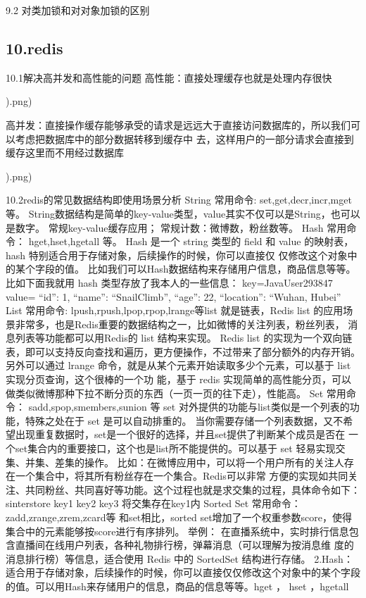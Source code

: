 \documentclass[UTF8]{ctexart}
\begin{document}
9.2 对类加锁和对对象加锁的区别

\subsection{10.redis}

10.1解决高并发和高性能的问题
高性能：直接处理缓存也就是处理内存很快

).png)

高并发：直接操作缓存能够承受的请求是远远大于直接访问数据库的，所以我们可以考虑把数据库中的部分数据转移到缓存中 去，这样用户的一部分请求会直接到缓存这里而不用经过数据库

).png)

10.2redis的常见数据结构即使用场景分析
String
常用命令: set,get,decr,incr,mget 等。 String数据结构是简单的key-value类型，value其实不仅可以是String，也可以是数字。 常规key-value缓存应用； 常规计数：微博数，粉丝数等。
Hash
常用命令： hget,hset,hgetall 等。
Hash 是一个 string 类型的 ﬁeld 和 value 的映射表，hash 特别适合用于存储对象，后续操作的时候，你可以直接仅 仅修改这个对象中的某个字段的值。 比如我们可以Hash数据结构来存储用户信息，商品信息等等。比如下面我就用 hash 类型存放了我本人的一些信息：
key=JavaUser293847 value={ “id”: 1, “name”: “SnailClimb”, “age”: 22, “location”: “Wuhan, Hubei” }
List
常用命令: lpush,rpush,lpop,rpop,lrange等list 就是链表，Redis list 的应用场景非常多，也是Redis重要的数据结构之一，比如微博的关注列表，粉丝列表， 消息列表等功能都可以用Redis的 list 结构来实现。 Redis list 的实现为一个双向链表，即可以支持反向查找和遍历，更方便操作，不过带来了部分额外的内存开销。
另外可以通过 lrange 命令，就是从某个元素开始读取多少个元素，可以基于 list 实现分页查询，这个很棒的一个功 能，基于 redis 实现简单的高性能分页，可以做类似微博那种下拉不断分页的东西（一页一页的往下走），性能高。
Set
常用命令： sadd,spop,smembers,sunion 等 set 对外提供的功能与list类似是一个列表的功能，特殊之处在于 set 是可以自动排重的。
当你需要存储一个列表数据，又不希望出现重复数据时，set是一个很好的选择，并且set提供了判断某个成员是否在 一个set集合内的重要接口，这个也是list所不能提供的。可以基于 set 轻易实现交集、并集、差集的操作。 比如：在微博应用中，可以将一个用户所有的关注人存在一个集合中，将其所有粉丝存在一个集合。Redis可以非常 方便的实现如共同关注、共同粉丝、共同喜好等功能。这个过程也就是求交集的过程，具体命令如下：
sinterstore key1 key2 key3 将交集存在key1内
Sorted Set
常用命令： zadd,zrange,zrem,zcard等 和set相比，sorted set增加了一个权重参数score，使得集合中的元素能够按score进行有序排列。
举例： 在直播系统中，实时排行信息包含直播间在线用户列表，各种礼物排行榜，弹幕消息（可以理解为按消息维 度的消息排行榜）等信息，适合使用 Redis 中的 SortedSet 结构进行存储。
2.Hash： 适合用于存储对象，后续操作的时候，你可以直接仅仅修改这个对象中的某个字段的值。可以用Hash来存储用户的信息，商品的信息等等。hget ， hset ，hgetall
\end{document}
